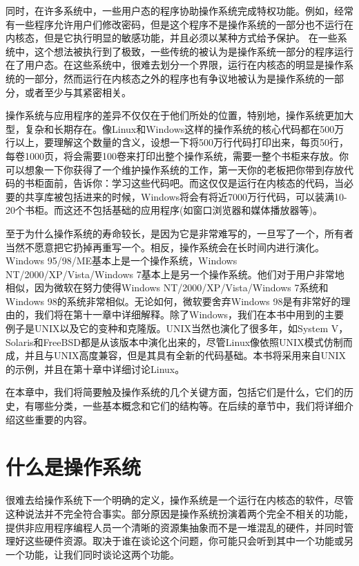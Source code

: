 	同时，在许多系统中，一些用户态的程序协助操作系统完成特权功能。例如，经常有一些程序允许用户们修改密码，但是这个程序不是操作系统的一部分也不运行在内核态，但是它执行明显的敏感功能，并且必须以某种方式给予保护。
	在一些系统中，这个想法被执行到了极致，一些传统的被认为是操作系统一部分的程序运行在了用户态。在这些系统中，很难去划分一个界限，运行在内核态的明显是操作系统的一部分，然而运行在内核态之外的程序也有争议地被认为是操作系统的一部分，或者至少与其紧密相关。
	
	操作系统与应用程序的差异不仅仅在于他们所处的位置，特别地，操作系统更加大型，复杂和长期存在。像Linux和Windows这样的操作系统的核心代码都在500万行以上，要理解这个数量的含义，设想一下将500万行代码打印出来，每页50行，每卷1000页，将会需要100卷来打印出整个操作系统，需要一整个书柜来存放。你可以想象一下你获得了一个维护操作系统的工作，第一天你的老板把你带到存放代码的书柜面前，告诉你：学习这些代码吧。而这仅仅是运行在内核态的代码，当必要的共享库被包括进来的时候，Windows将会有将近7000万行代码，可以装满10-20个书柜。而这还不包括基础的应用程序(如窗口浏览器和媒体播放器等)。
	
	至于为什么操作系统的寿命较长，是因为它是非常难写的，一旦写了一个，所有者当然不愿意把它扔掉再重写一个。相反，操作系统会在长时间内进行演化。Windows 95/98/ME基本上是一个操作系统，Windows NT/2000/XP/Vista/Windows 7基本上是另一个操作系统。他们对于用户非常地相似，因为微软在努力使得Windows NT/2000/XP/Vista/Windows 7系统和Windows 98的系统非常相似。无论如何，微软要舍弃Windows 98是有非常好的理由的，我们将在第十一章中详细解释。除了Windows，我们在本书中用到的主要例子是UNIX以及它的变种和克隆版。UNIX当然也演化了很多年，如System V，Solaris和FreeBSD都是从该版本中演化出来的，尽管Linux像依照UNIX模式仿制而成，并且与UNIX高度兼容，但是其具有全新的代码基础。本书将采用来自UNIX的示例，并且在第十章中详细讨论Linux。
	
	在本章中，我们将简要触及操作系统的几个关键方面，包括它们是什么，它们的历史，有哪些分类，一些基本概念和它们的结构等。在后续的章节中，我们将详细介绍这些重要的内容。

\section{什么是操作系统}

	很难去给操作系统下一个明确的定义，操作系统是一个运行在内核态的软件，尽管这种说法并不完全符合事实。部分原因是操作系统扮演着两个完全不相关的功能，提供非应用程序编程人员一个清晰的资源集抽象而不是一堆混乱的硬件，并同时管理好这些硬件资源。取决于谁在谈论这个问题，你可能只会听到其中一个功能或另一个功能，让我们同时谈论这两个功能。
	
